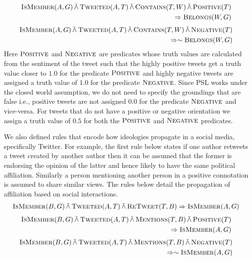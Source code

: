 \begin{align*}
\begin{split}
\textsc{IsMember}(A,G)
	 \softand \textsc{Tweeted}(A,T)
	\softand \textsc{Contains}(T,W)
	 \softand \textsc{Positive}(T) \\
	\Rightarrow \textsc{Belongs}(W,G)
\end{split}
\end{align*}
\begin{align*}
\begin{split}
\textsc{IsMember}(A,G) 
	\softand \textsc{Tweeted}(A,T)
	\softand \textsc{Contains}(T,W)
	\softand \textsc{Negative}(T)\\
	\Rightarrow \sim \textsc{Belongs}(W,G)
\end{split}
\end{align*}
Here $\textsc{Positive}$ and $\textsc{Negative}$ are predicates whose truth values are calculated from the sentiment of the tweet such that the highly positive tweets get a truth value closer to $1.0$ for the predicate $\textsc{Positive}$ and highly negative tweets are assigned a truth value of $1.0$ for the predicate $\textsc{Negative}$. 
Since PSL works under the closed world assumption, we do not need to specify the groundings that are false i.e., positive tweets are not assigned $0.0$ for the predicate $\textsc{Negative}$ and vice-versa.
For tweets that do not have a positive or negative orientation we assign a truth value of $0.5$ for both the $\textsc{Positive}$ and $\textsc{Negative}$ predicates.

We also defined rules that encode how ideologies propagate in a social media, specifically Twitter.
For example, the first rule below states if one author retweets a tweet created by another author then it can be assumed that the former is endorsing the opinion of the latter and hence likely to have the same political affiliation. 
Similarly a person mentioning another person in a positive connotation is assumed to share similar views.
The rules below detail the propagation of affiliation based on social interactions.
\begin{align*}
\begin{split}
\textsc{IsMember}(B,G) 
	\softand \textsc{Tweeted}(A,T)
	\softand \textsc{ReTweet}(T,B)
	\Rightarrow \textsc{IsMember}(A,G)
\end{split}
\end{align*}
\begin{align*}
\begin{split}
\textsc{IsMember}(B,G) 
	\softand \textsc{Tweeted}(A,T)
	\softand \textsc{Mentions}(T,B)
	\softand \textsc{Positive}(T)\\
	\Rightarrow \textsc{IsMember}(A,G)
\end{split}
\end{align*}
\begin{align*}
\begin{split}
\textsc{IsMember}(B,G) 
	\softand \textsc{Tweeted}(A,T)
	\softand \textsc{Mentions}(T,B)
	\softand \textsc{Negative}(T)\\
	\Rightarrow \sim \textsc{IsMember}(A,G)
\end{split}
\end{align*}

